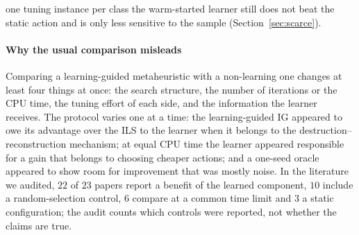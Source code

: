 one tuning instance per class the warm-started learner still does not beat the static action and is only less sensitive to the sample (Section~\ref{sec:scarce}).

\paragraph{Why the usual comparison misleads} Comparing a learning-guided metaheuristic with a non-learning one changes at least four things at once: the search structure, the number of iterations or the CPU time, the tuning effort of each side, and the information the learner receives. The protocol varies one at a time: the learning-guided IG appeared to owe its advantage over the ILS to the learner when it belongs to the destruction--reconstruction mechanism; at equal CPU time the learner appeared responsible for a gain that belongs to choosing cheaper actions; and a one-seed oracle appeared to show room for improvement that was mostly noise. In the literature we audited, $22$ of $23$ papers report a benefit of the learned component, $10$ include a random-selection control, $6$ compare at a common time limit and $3$ a static configuration; the audit counts which controls were reported, not whether the claims are true.

